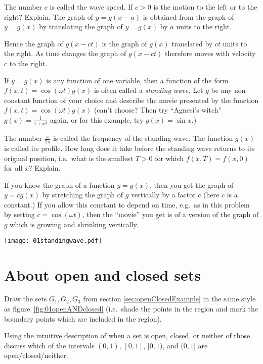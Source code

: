 The number $c$ is called the wave speed.  If $c>0$ is the motion to
the left or to the right? Explain.
\answer%
The graph of $y=g(x-a)$ is obtained from the graph of $y=g(x)$ by
translating the graph of $y=g(x)$ by $a$ units to the right.

Hence the graph of $g(x-ct)$ is the graph of $g(x)$ translated by $ct$
units to the right.  As time changes the graph of $g(x-ct)$ therefore
moves with velocity $c$ to the right.
\endanswer


\problem If $y=g(x)$ is any function of one variable, then a function%
of the form $f(x, t) = \cos(\omega t) g(x)$ is often called a
\emph{standing wave.}
Let $g$ be any non constant function of your choice and describe the
movie presented by the function $f(x, t) = \cos(\omega t)g(x)$
(can't choose?  Then try ``Agnesi's witch''  $g(x) = \frac{1}{1+x^2}$
again, or for this example, try $g(x) = \sin x$.)

The number $\frac\omega{2\pi}$ is called the frequency of the standing
wave.  The function $g(x)$ is called its profile.  How long does it
take before the standing wave returns to its original position, i.e.\
what is the smallest $T>0$ for which $f(x, T) = f(x, 0)$ for all $x$?
Explain.

\answer%
If you know the graph of a function $y=g(x)$, then you get
the graph of $y=cg(x)$ by stretching the graph of $g$ vertically by
a factor $c$ (here $c$ is a constant.)
If you allow this constant to depend on time, e.g.\ as in this
problem by setting $c=\cos(\omega t)$, then the ``movie'' you get is of a
version of the graph of $g$ which is growing and shrinking vertically.

\begin{center}
    \texttt{[image: 01standingwave.pdf]}
\end{center}
\endanswer


\section*{About open and closed sets} %

\problem Draw the sets $G_1, G_2, G_3$ from section%
\ref{sec:openClosedExample} in the same style as
figure~\ref{fig:01openANDclosed} (i.e.\ shade the points in the region
and mark the boundary points which are included in the region).

\problem Using the intuitive description of when a set is open,%
closed, or neither of those, discuss which of the intervals $(0,1)$,
$[0,1]$, $[0,1)$, and $(0,1]$ are open/closed/neither.

